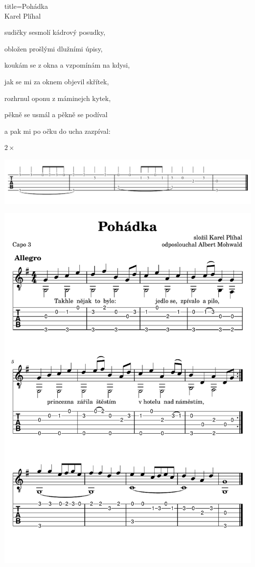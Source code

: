 \begin{song}{title=\predtitle\centering Pohádka \\\large Karel Plíhal\vspace*{-1.0cm}}
\begin{centerjustified}
sudičky sesmolí kádrový posudky,

obložen prošlými dlužními úpisy,

koukám se z okna a vzpomínám na kdysi,

jak se mi za oknem objevil skřítek,

rozhrnul oponu z máminejch kytek,

pěkně se usmál a pěkně se podíval

a pak mi po očku do ucha zazpíval:

 $2\times$

\hspace*{-1.5cm}
\includegraphics[scale=0.83]{../taby/pohadka.pdf}
\hspace*{-1.5cm}
\end{centerjustified}

\newpage
\centering
\includegraphics[scale=1.1]{../taby/pohadka-komplet.pdf}

\setcounter{Slokočet}{0}
\end{song}
